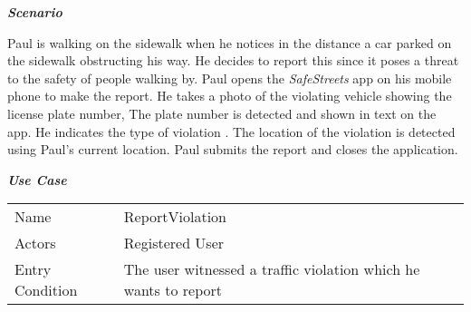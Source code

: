\emph{\textbf{Scenario}}

Paul is walking on the sidewalk when he notices in the distance a car parked on the sidewalk obstructing his way. He decides to report this since it poses a threat to the safety of people walking by. Paul opens the \emph{SafeStreets} app on his mobile phone to make the report. He takes a photo of the violating vehicle showing the license plate number, The plate number is detected and shown in text on the app. He indicates the type of violation . The location of the violation is detected using Paul's current location. Paul submits the report and closes the application.

\emph{\textbf{Use Case}}

\begin{table}[]
\begin{tabular}{ll}
Name            & ReportViolation                                                                                                                                                                                                                                                                                                                                                                                                                                                                                                                                                                                                                                                                                                                                                                              \\
Actors          & Registered User                                                                                                                                                                                                                                                                                                                                                                                                                                                                                                                                                                                                                                                                                                                                                                              \\
Entry Condition & The user witnessed a traffic violation which he wants to report                                                                                                                                                                                                                                                                                                                                                                                                                                                                                                                                                                                                                                                                                                                              \\

\end{tabular}
\end{table}

